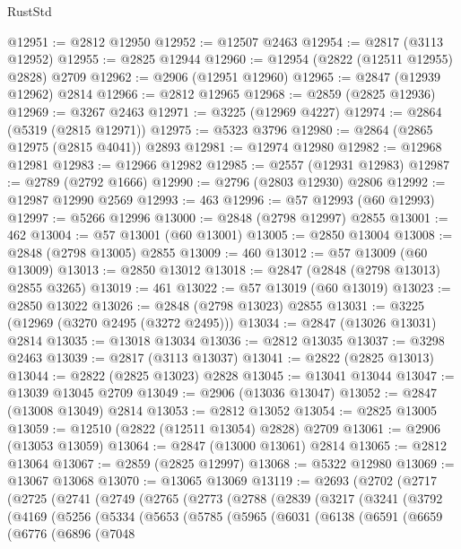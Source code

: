 \begin{lexlean}{RustStd}
\begin{coremodule}
@12951 := @2812 @12950
@12952 := @12507 @2463
@12954 := @2817 (@3113 @12952)
@12955 := @2825 @12944
@12960 := @12954 (@2822 (@12511 @12955) @2828) @2709
@12962 := @2906 (@12951 @12960)
@12965 := @2847 (@12939 @12962) @2814
@12966 := @2812 @12965
@12968 := @2859 (@2825 @12936)
@12969 := @3267 @2463
@12971 := @3225 (@12969 @4227)
@12974 := @2864 (@5319 (@2815 @12971))
@12975 := @5323 @3796
@12980 := @2864 (@2865 @12975 (@2815 @4041)) @2893
@12981 := @12974 @12980
@12982 := @12968 @12981
@12983 := @12966 @12982
@12985 := @2557 (@12931 @12983)
@12987 := @2789 (@2792 @1666)
@12990 := @2796 (@2803 @12930) @2806
@12992 := @12987 @12990 @2569
@12993 := 463
@12996 := @57 @12993 (@60 @12993)
@12997 := @5266 @12996
@13000 := @2848 (@2798 @12997) @2855
@13001 := 462
@13004 := @57 @13001 (@60 @13001)
@13005 := @2850 @13004
@13008 := @2848 (@2798 @13005) @2855
@13009 := 460
@13012 := @57 @13009 (@60 @13009)
@13013 := @2850 @13012
@13018 := @2847 (@2848 (@2798 @13013) @2855 @3265)
@13019 := 461
@13022 := @57 @13019 (@60 @13019)
@13023 := @2850 @13022
@13026 := @2848 (@2798 @13023) @2855
@13031 := @3225 (@12969 (@3270 @2495 (@3272 @2495)))
@13034 := @2847 (@13026 @13031) @2814
@13035 := @13018 @13034
@13036 := @2812 @13035
@13037 := @3298 @2463
@13039 := @2817 (@3113 @13037)
@13041 := @2822 (@2825 @13013)
@13044 := @2822 (@2825 @13023) @2828
@13045 := @13041 @13044
@13047 := @13039 @13045 @2709
@13049 := @2906 (@13036 @13047)
@13052 := @2847 (@13008 @13049) @2814
@13053 := @2812 @13052
@13054 := @2825 @13005
@13059 := @12510 (@2822 (@12511 @13054) @2828) @2709
@13061 := @2906 (@13053 @13059)
@13064 := @2847 (@13000 @13061) @2814
@13065 := @2812 @13064
@13067 := @2859 (@2825 @12997)
@13068 := @5322 @12980
@13069 := @13067 @13068
@13070 := @13065 @13069
@13119 := @2693
    (@2702
      (@2717
        (@2725
          (@2741
            (@2749
              (@2765
                (@2773
                  (@2788
                    (@2839
                      (@3217
                        (@3241
                          (@3792
                            (@4169
                              (@5256
                                (@5334
                                  (@5653
                                    (@5785
                                      (@5965
                                        (@6031
                                          (@6138
                                            (@6591
                                              (@6659
                                                (@6776
                                                  (@6896
                                                    (@7048

\end{coremodule}
\end{lexlean}
